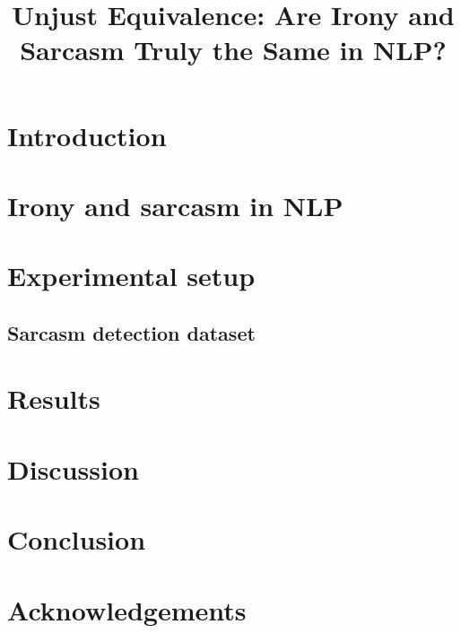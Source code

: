 \documentclass[10pt, a4paper]{article}
\title{Unjust Equivalence: Are Irony and Sarcasm Truly the Same in NLP?}
\begin{document}
\maketitleabstract

\section{Introduction}

\section{Irony and sarcasm in NLP}

\section{Experimental setup}
\subsection{Sarcasm detection dataset}
\citep{iSarcasm}
\section{Results}

\section{Discussion}

\section{Conclusion}

\section*{Acknowledgements}


 
\end{document}
